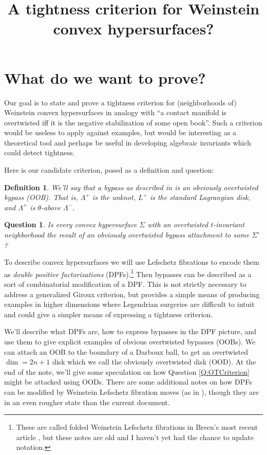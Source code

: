 \documentclass[11pt]{amsart}
\title[Weinstein convex hypersurfaces]{A tightness criterion for Weinstein convex hypersurfaces?}
\newcommand{\Leg}{\Lambda}
\newcommand{\Lag}{L}
\newcommand{\posLag}{\Lag^{+}}
\newcommand{\posLeg}{\Leg^{+}}
\newcommand{\negLeg}{\Leg^{-}}
\newtheorem{defn}[thm]{Definition}
\newtheorem{q}[thm]{Question}
\begin{document}
\setcounter{tocdepth}{1}
\maketitle
\tableofcontents

\section{What do we want to prove?}

Our goal is to state and prove a tightness criterion for (neighborhoods of) Weinstein convex hypersurfaces \cite{HH:Convex} in analogy with ``a contact manifold is overtwisted iff it is the negative stabilization of some open book''. Such a criterion would be useless to apply against examples, but would be interesting as a theoretical tool and perhaps be useful in developing algebraic invariants which could detect tightness.

Here is our candidate criterion, posed as a definition and question:

\begin{defn}\label{Def:OOB}
We'll say that a bypass as described in \cite[\S 10]{HH:Bypass} is an \emph{obviously overtwisted bypass} (OOB). That is, $\posLeg$ is the unknot, $\posLag$ is the standard Lagrangian disk, and $\posLeg$ is $\theta$-above $\negLeg$.
\end{defn}

\begin{q}\label{Q:OTCriterion}
Is every convex hypersurface $\Sigma$ with an overtwisted $t$-invariant neighborhood the result of an obviously overtwisted bypass attachment to some $\Sigma'$?
\end{q}

To describe convex hypersurfaces we will use Lefschetz fibrations to encode them as \emph{double positive factorizations} (DPFs).\footnote{These are called folded Weinstein Lefschetz fibrations in Breen's most recent article \cite{Breen:Folded}, but these notes are old and I haven't yet had the chance to update notation.} Then bypasses can be described as a sort of combinatorial modification of a DPF. This is not strictly necessary to address a generalized Giroux criterion, but provides a simple means of producing examples in higher dimensions where Legendrian surgeries are difficult to intuit and could give a simpler means of expressing a tightness criterion.

We'll describe what DPFs are, how to express bypasses in the DPF picture, and use them to give explicit examples of obvious overtwisted bypasses (OOBs). We can attach an OOB to the boundary of a Darboux ball, to get an overtwisted $\dim=2n+1$ disk which we call the obviously overtwisted disk (OOD). At the end of the note, we'll give some speculation on how Question \eqref{Q:OTCriterion} might be attacked using OODs. There are some additional notes on how DPFs can be modified by Weinstein Lefschetz fibration moves (as in \cite{BHH:GirouxCorrespondence}), though they are in an even rougher state than the current document.
\end{document}
